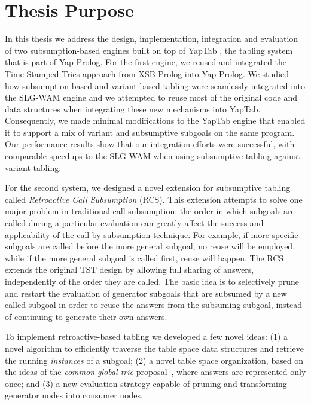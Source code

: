 \section{Thesis Purpose}

In this thesis we address the design, implementation, integration and evaluation of two subsumption-based engines
built on top of YapTab \cite{Rocha-00a}, the tabling system that is part of Yap Prolog. For the first engine, we
reused and integrated the Time Stamped Tries approach from XSB Prolog into Yap Prolog.
We studied how subsumption-based and variant-based tabling were seamlessly
integrated into the SLG-WAM engine and we attempted to reuse most of the original code and data structures when
integrating these new mechanisms into YapTab.  Consequently, we made minimal modifications to the YapTab engine
that enabled it to support a mix of variant and subsumptive subgoals on the same program.
Our performance results show that our integration efforts were successful, with comparable
speedups to the SLG-WAM when using subsumptive tabling against variant tabling.

For the second system, we designed a novel extension for subsumptive tabling called
\emph{Retroactive Call Subsumption} (RCS).
This extension attempts to solve one major problem in traditional call subsumption: the order in
which subgoals are called during a particular evaluation can greatly affect the success and applicability
of the call by subsumption technique. For example, if more specific subgoals are called before
the more general subgoal, no reuse will be employed, while if the more general subgoal is called first,
reuse will happen. The RCS extends the original TST design by allowing full sharing of answers, independently
of the order they are called. The basic idea is to selectively prune and restart the evaluation of generator
subgoals that are subsumed by a new called subgoal in order to reuse the answers from the subsuming subgoal,
instead of continuing to generate their own answers.

To implement retroactive-based tabling we developed a few novel ideas: (1) a novel algorithm to efficiently
traverse the table space data structures and retrieve the running \emph{instances} of a subgoal; (2) a novel table
space organization, based on the ideas of the \emph{common global trie} proposal~\cite{CostaJ-08}, where answers
are represented only once; and (3) a new evaluation strategy capable of pruning and transforming generator nodes
into consumer nodes.

